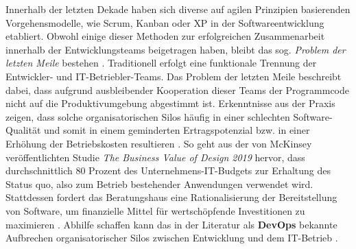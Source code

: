 Innerhalb der letzten Dekade haben sich diverse auf agilen Prinzipien basierenden Vorgehensmodelle, wie Scrum, Kanban oder \ac{XP} in der Softwareentwicklung etabliert. Obwohl einige dieser Methoden zur erfolgreichen Zusammenarbeit innerhalb der Entwicklungsteams beigetragen haben, bleibt das sog.  \textit{Problem der letzten Meile} bestehen \cite{Qentelli.20230305}. Traditionell erfolgt eine funktionale Trennung der Entwickler- und IT-Betriebler-Teams. Das Problem der letzten Meile beschreibt dabei, dass aufgrund ausbleibender Kooperation dieser Teams der Programmcode nicht auf die Produktivumgebung abgestimmt ist. Erkenntnisse aus der Praxis zeigen, dass solche organisatorischen Silos häufig in einer schlechten Software-Qualität und somit in einem geminderten Ertragspotenzial bzw. in einer Erhöhung der Betriebskosten resultieren \cite[1]{Halstenberg.2020}. So geht aus der von McKinsey veröffentlichten Studie \textit{The Business Value of Design 2019} hervor, dass durchschnittlich 80 Prozent des Unternehmens-IT-Budgets zur Erhaltung des Status quo, also zum Betrieb bestehender Anwendungen verwendet wird. Stattdessen fordert das Beratungshaus eine Rationalisierung der Bereitstellung von Software, um finanzielle Mittel für wertschöpfende Investitionen zu maximieren \cite{.20230305}. Abhilfe schaffen kann das in der Literatur als \textbf{\ac{DevOps}} bekannte Aufbrechen organisatorischer Silos zwischen Entwicklung und dem IT-Betrieb \cite[1]{Halstenberg.2020}. 
